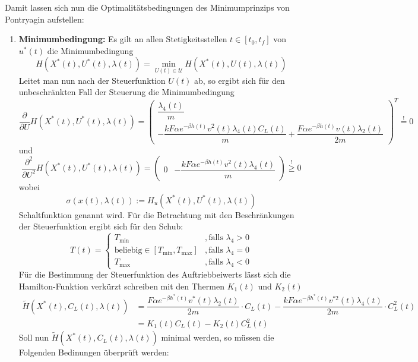 Damit lassen sich nun die Optimalitätsbedingungen des Minimumprinzips von Pontryagin aufstellen:
\begin{enumerate}
    \item \textbf{Minimumbedingung:} Es gilt an allen Stetigkeitsstellen $t \in [t_0,t_f]$ von $u^{\ast}(t)$ die Minimumbedingung \[H(X^{\ast}(t),U^{\ast}(t),\lambda(t)) = \min_{U(t) \in \mathcal{U}} H(X^{\ast}(t),U(t),\lambda(t))\] Leitet man nun nach der Steuerfunktion $U(t)$ ab, so ergibt sich für den unbeschränkten Fall der Steuerung die Minimumbedingung
    \[\dfrac{\partial}{\partial U} H(X^{\ast}(t),U^{\ast}(t),\lambda(t)) = \begin{pmatrix}
    \dfrac{\lambda_4(t)}{m} \\ 
    - \dfrac{k F \alpha e^{-\beta h(t)} v^2(t) \lambda_4(t) C_L(t)}{m} + \dfrac{F \alpha e^{-\beta h(t)} v(t) \lambda_2(t)}{2m}
    \end{pmatrix}^T \stackrel{!}{=} 0\]
    und 
    \[\dfrac{\partial^2}{\partial U^2} H(X^{\ast}(t),U^{\ast}(t),\lambda(t)) = \begin{pmatrix}
    0 & - \dfrac{k F \alpha e^{-\beta h(t)} v^2(t) \lambda_4(t)}{m} 
    \end{pmatrix} \stackrel{!}{\geq} 0\] wobei \[\sigma(x(t),\lambda(t)) := H_u(X^{\ast}(t),U^{\ast}(t),\lambda(t))\] Schaltfunktion genannt wird. Für die Betrachtung mit den Beschränkungen der Steuerfunktion ergibt sich für den Schub:
    \[T(t) = \left\lbrace \begin{array}{ll}
    T_{\min} & ,\text{falls } \lambda_4 > 0  \\ 
    \text{beliebig} \in [T_{\min},T_{\max}] & ,\text{falls } \lambda_4 = 0  \\ 
    T_{\max} & ,\text{falls } \lambda_4 < 0
    \end{array} \right.\]
    Für die Bestimmung der Steuerfunktion des Auftriebbeiwerts lässt sich die Hamilton-Funktion verkürzt schreiben mit den Thermen $K_1(t)$ und $K_2(t)$
    \[
    \begin{split}
        \tilde{H}(X^{\ast}(t),C_L(t),\lambda(t)) &= \dfrac{F \alpha e^{-\beta h^{\ast}(t)} v^{\ast}(t) \lambda_2(t)}{2m} \cdot C_L(t) - \dfrac{k F \alpha e^{-\beta h^{\ast}(t)}  v^{\ast 2}(t) \lambda_4(t)}{2m} \cdot C_L^2(t) \\\
        &= K_1(t) C_L(t) - K_2(t) C_L^2(t)
    \end{split}
    \]
    Soll nun $\tilde{H}(X^{\ast}(t),C_L(t),\lambda(t))$ minimal werden, so müssen die Folgenden Bedinungen überprüft werden:
    \begin{enumerate}

\end{enumerate}
\end{enumerate}
